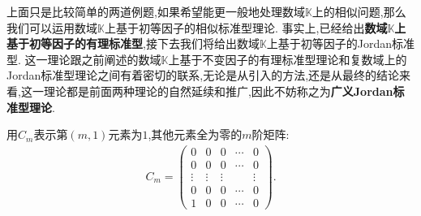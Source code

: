 \documentclass[../../main.tex]{subfiles}
\begin{document}
上面只是比较简单的两道例题,如果希望能更一般地处理数域$\mathbb{K}$上的相似问题,那么我们可以运用数域$\mathbb{K}$上基于初等因子的相似标准型理论. 事实上,已经给出\textbf{数域$\mathbb{K}$上基于初等因子的有理标准型},接下去我们将给出数域$\mathbb{K}$上基于初等因子的Jordan标准型. 这一理论跟之前阐述的数域$\mathbb{K}$上基于不变因子的有理标准型理论和复数域上的Jordan标准型理论之间有着密切的联系,无论是从引入的方法,还是从最终的结论来看,这一理论都是前面两种理论的自然延续和推广,因此不妨称之为\textbf{广义Jordan标准型理论}. 

\vspace{0.5cm}

\begin{definition}
用$C_m$表示第$(m,1)$元素为$1$,其他元素全为零的$m$阶矩阵:
\begin{align*}
C_m = 
\begin{pmatrix}
0 & 0 & 0 & \cdots & 0 \\
0 & 0 & 0 & \cdots & 0 \\
\vdots & \vdots & \vdots & & \vdots \\
0 & 0 & 0 & \cdots & 0 \\
1 & 0 & 0 & \cdots & 0
\end{pmatrix}.
\end{align*}
\end{definition}
\end{document}
